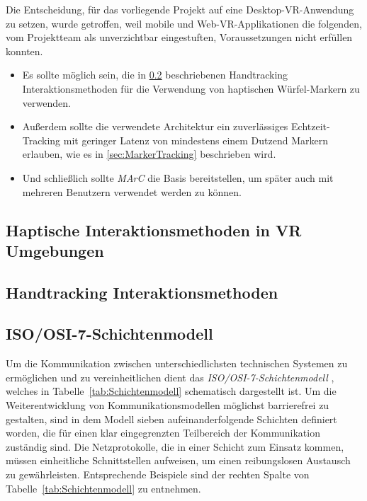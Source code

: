 Die Entscheidung, für das vorliegende Projekt auf eine Desktop-VR-Anwendung zu setzen, wurde getroffen, weil mobile und Web-VR-Applikationen die folgenden, vom Projektteam als unverzichtbar eingestuften, Voraussetzungen nicht erfüllen konnten.
\begin{itemize}
	\item Es sollte möglich sein, die in \ref{sec:HandtrackingAnwendungen} beschriebenen Handtracking Interaktionsmethoden für die Verwendung von haptischen Würfel-Markern zu verwenden.
	\item Außerdem sollte die verwendete Architektur ein zuverlässiges Echtzeit-Tracking mit geringer Latenz von mindestens einem Dutzend Markern erlauben, wie es in \ref{sec:MarkerTracking} beschrieben wird.
	\item Und schließlich sollte \emph{MArC} die Basis bereitstellen, um später auch mit mehreren Benutzern verwendet werden zu können.
\end{itemize}

\subsection{Haptische Interaktionsmethoden in VR Umgebungen}\label{sec:HaptikAnwendungen}
\subsection{Handtracking Interaktionsmethoden}\label{sec:HandtrackingAnwendungen}
\subsection{ISO/OSI-7-Schichtenmodell}\label{sec:Netzwerk}
Um die Kommunikation zwischen unterschiedlichsten technischen Systemen zu ermöglichen und zu vereinheitlichen dient das \textit{ISO/OSI-7-Schichtenmodell} \cite{ITU}, welches in Tabelle~\ref{tab:Schichtenmodell} schematisch dargestellt ist. Um die Weiterentwicklung von Kommunikationsmodellen möglichst barrierefrei zu gestalten, sind in dem Modell sieben aufeinanderfolgende Schichten definiert worden, die für einen klar eingegrenzten Teilbereich der Kommunikation zuständig sind. Die Netzprotokolle, die in einer Schicht zum Einsatz kommen, müssen einheitliche Schnittstellen aufweisen, um einen reibungslosen Austausch zu gewährleisten. Entsprechende Beispiele sind der rechten Spalte von Tabelle~\ref{tab:Schichtenmodell} zu entnehmen.\\

